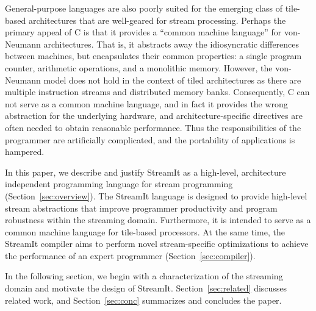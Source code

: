 General-purpose  languages are  also  poorly suited  for the  emerging
class of  tile-based architectures \cite{smartmemories,rawshort,trips}
that are  well-geared  for stream processing.   Perhaps the
primary appeal of C is  that it provides a ``common machine language''
for  von-Neumann  architectures.   That  is,  it  abstracts  away  the
idiosyncratic  differences between  machines,  but encapsulates  their
common  properties: a single  program counter,  arithmetic operations,
and a monolithic memory.  However, the von-Neumann model does not hold
in  the   context  of  tiled  architectures  as   there  are  multiple
instruction streams and distributed  memory banks. Consequently, C can
not serve  as a common machine  language, and in fact  it provides the
wrong    abstraction     for    the    underlying     hardware,    and
architecture-specific directives are often needed to obtain reasonable
performance.   Thus   the  responsibilities  of   the  programmer  are
artificially  complicated,   and  the  portability   of  applications  is
hampered.

In  this paper,  we describe  and  justify StreamIt  as a  high-level,
architecture independent  programming language for  stream programming
(Section~\ref{sec:overview}).  The  StreamIt  language is  designed  to
provide  high-level   stream  abstractions  that   improve  programmer
productivity   and    program   robustness   within    the   streaming
domain.  Furthermore, it  is intended  to  serve as  a common  machine
language for  tile-based processors.  At  the same time,  the StreamIt
compiler  aims  to  perform  novel  stream-specific  optimizations  to
achieve     the     performance     of    an     expert     programmer
(Section~\ref{sec:compiler}). 

In  the following  section, we  begin with  a characterization  of the
streaming   domain  and   motivate   the  design   of  StreamIt.    
Section~\ref{sec:related} discusses related
work, and Section~\ref{sec:conc} summarizes and concludes the paper.
